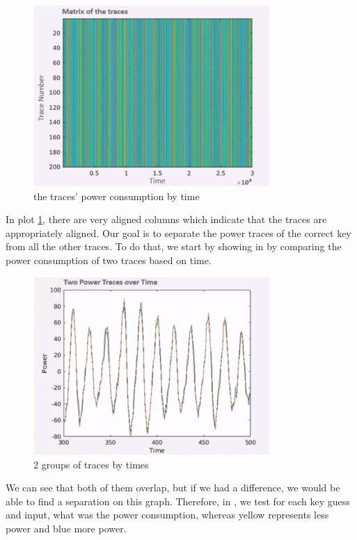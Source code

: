 \begin{figure}[!ht]
    \centering
    \includegraphics[width=0.8\textwidth]{images/Lecture6/traceByTime.png}
    \caption{the traces' power consumption by time} \label{fig:traceByTime}
\end{figure}

In plot \ref{fig:traceByTime}, there are very aligned columns which indicate that the traces are appropriately aligned. 
Our goal is to separate the power traces of the correct key from all the other traces. 
To do that, we start by showing in  by comparing the power consumption of two traces based on time.

\begin{figure}[!ht]
    \centering
    \includegraphics[width=0.8\textwidth]{images/Lecture6/2traces-by-time.png}
    \caption{2 groups of traces by times} \label{fig:2traces-by-time}
\end{figure}

We can see that both of them overlap, but if we had a difference, we would be able to find a separation on this graph.
Therefore, in , we test for each key guess and input, what was the power consumption, whereas yellow represents less power and blue more power.

